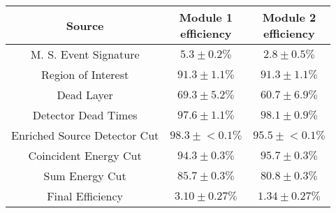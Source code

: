 \begin{tabular}{|c|c|c|}
\hline
  Source & \makecell{Module 1\\efficiency} & \makecell{Module 2\\efficiency} \\
\hline
  M. S. Event Signature & $5.3 \pm 0.2\%$ & $2.8 \pm 0.5\%$ \\
  Region of Interest & $91.3 \pm 1.1\%$ & $91.3 \pm 1.1\%$ \\
  Dead Layer & $69.3 \pm 5.2\%$ & $60.7 \pm 6.9\%$ \\
  Detector Dead Times & $97.6 \pm 1.1\%$ & $98.1 \pm 0.9\%$ \\
  Enriched Source Detector Cut & $98.3 \pm{}<\!0.1\%$ & $95.5 \pm{}<\!0.1\%$ \\
  Coincident Energy Cut & $94.3 \pm 0.3\%$ & $95.7 \pm 0.3\%$ \\
  Sum Energy Cut & $85.7 \pm 0.3\%$ & $80.8 \pm 0.3\%$ \\
  \hline Final Efficiency & $3.10 \pm 0.27\%$ & $1.34 \pm 0.27\%$ \\
\hline
\end{tabular}
